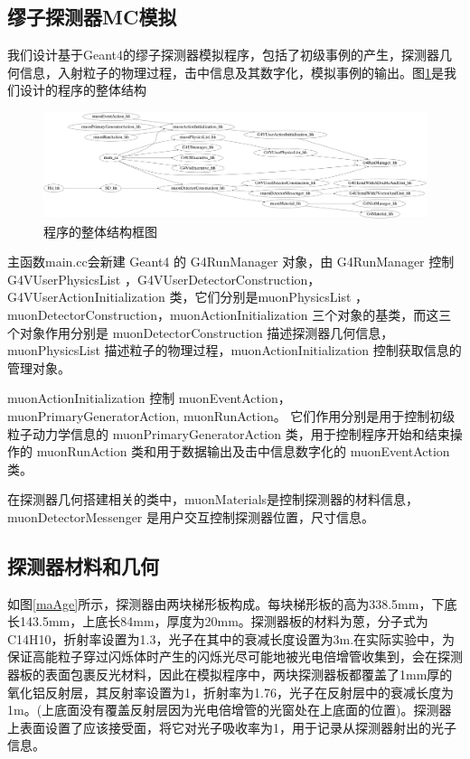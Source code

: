 \documentclass[aps,prd,superscriptaddress,nofootinbib,preprint]{ctexart}
\begin{document}
\begin{CJK}{UTF8}{gbsn}
\section{缪子探测器MC模拟}

我们设计基于Geant4的缪子探测器模拟程序，包括了初级事例的产生，探测器几何信息，入射粒子的物理过程，击中信息及其数字化，模拟事例的输出。图\ref{gen}是我们设计的程序的整体结构\\
\begin{figure}[h]
    \centering\includegraphics[width=\textwidth]{pic/main.jpg}
    \caption{程序的整体结构框图}\label{gen}
\end{figure}


主函数main.cc会新建 Geant4 的 G4RunManager 对象，由 G4RunManager 控制 G4VUserPhysicsList ，G4VUserDetectorConstruction，G4VUserActionInitialization 类，它们分别是muonPhysicsList ，muonDetectorConstruction，muonActionInitialization 三个对象的基类，而这三个对象作用分别是 muonDetectorConstruction 描述探测器几何信息， muonPhysicsList 描述粒子的物理过程，muonActionInitialization 控制获取信息的管理对象。

muonActionInitialization 控制 muonEventAction， muonPrimaryGeneratorAction, muonRunAction。 它们作用分别是用于控制初级粒子动力学信息的  muonPrimaryGeneratorAction 类，用于控制程序开始和结束操作的 muonRunAction 类和用于数据输出及击中信息数字化的 muonEventAction 类。

在探测器几何搭建相关的类中，muonMaterials是控制探测器的材料信息，muonDetectorMessenger 是用户交互控制探测器位置，尺寸信息。

\subsection{探测器材料和几何}

如图\ref{maAge}所示，探测器由两块梯形板构成。每块梯形板的高为338.5mm，下底长143.5mm，上底长84mm，厚度为20mm。探测器板的材料为蒽，分子式为C14H10，折射率设置为1.3，光子在其中的衰减长度设置为3m.在实际实验中，为保证高能粒子穿过闪烁体时产生的闪烁光尽可能地被光电倍增管收集到，会在探测器板的表面包裹反光材料，因此在模拟程序中，两块探测器板都覆盖了1mm厚的氧化铝反射层，其反射率设置为1，折射率为1.76，光子在反射层中的衰减长度为1m。(上底面没有覆盖反射层因为光电倍增管的光窗处在上底面的位置)。探测器上表面设置了应该接受面，将它对光子吸收率为1，用于记录从探测器射出的光子信息。


\end{CJK}
\end{document}
